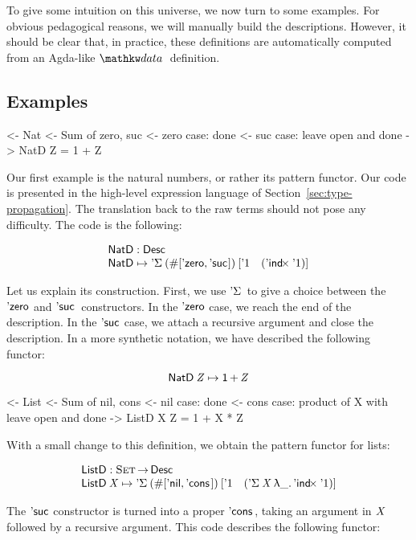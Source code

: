 To give some intuition on this universe, we now turn to some
examples. For obvious pedagogical reasons, we will manually build the
descriptions. However, it should be clear that, in practice, these
definitions are automatically computed from an Agda-like $\data$
definition.

\subsection{Examples}
\label{sec:desc-examples}

\begin{wstructure}
<- Nat
    <- Sum of zero, suc
    <- zero case: done
    <- suc case: leave open and done
    -> NatD Z = 1 + Z
\end{wstructure}

Our first example is the natural numbers, or rather its pattern
functor. Our code is presented in the high-level expression language
of Section~\ref{sec:type-propagation}. The translation back to the raw
terms should not pose any difficulty. The code is the following:

\[\stk{
\NatD : \Desc \\
\NatD \mapsto \DSigma{(\EnumT{[ \NatZero, \NatSuc{\!} ]})}
                     {[ \DUnit \quad (\DIndx{\DUnit}) ]}
}\]

Let us explain its construction. First, we use $\DSigma{\!}{\!}$ to
give a choice between the $\NatZero$ and $\NatSuc{}$ constructors. In
the $\NatZero$ case, we reach the end of the description. In the
$\NatSuc{\!}$ case, we attach a recursive argument and close the
description. In a more synthetic notation, we have described the
following functor:

\[    \NatD\: \V{Z} \mapsto \Unit \mathop{\D{+}} \V{Z}    \]

\begin{wstructure}
<- List
    <- Sum of nil, cons
    <- nil case: done
    <- cons case: product of X with leave open and done
    -> ListD X Z = 1 + X * Z
\end{wstructure}

With a small change to this definition, we obtain the pattern functor
for lists:

\[\stk{
\ListD : \Set \To \Desc \\
\ListD \: \V{X} \mapsto \DSigma{(\EnumT{[ \ListNil, \ListCons{\!}{\!} ]})}
                           {[ \DUnit \quad (\DSigma{\V{X}}{\LAM{\_} \DIndx{\DUnit}}) ]}
}\]


The $\NatSuc{\!}$ constructor is turned into a proper
$\ListCons{\!}{\!}$, taking an argument in $\V{X}$ followed by a
recursive argument. This code describes the following functor:

